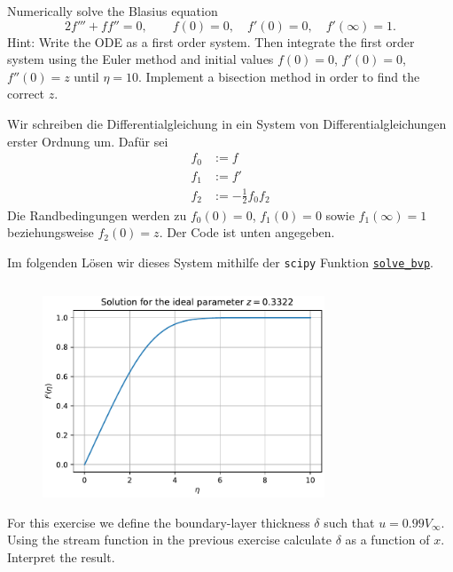\documentclass[12pt]{exam}
\begin{document}
\begin{questions}
    
    \question Numerically solve the Blasius equation
    \begin{equation*}
        2 f''' + ff'' = 0, \qquad f(0) = 0, \quad f'(0) = 0, \quad f'(\infty) = 1.
    \end{equation*}
    Hint: Write the ODE as a first order system. Then integrate the first order system using the Euler method and initial values $f(0) = 0$, $f'(0) = 0$, $f''(0) = z$ until $\eta = 10$. Implement a bisection method in order to find the correct $z$.

    \begin{solution}
        Wir schreiben die Differentialgleichung in ein System von Differentialgleichungen erster Ordnung um. Dafür sei
        \begin{align*}
            f_0 &:= f \\
            f_1 &:= f' \\
            f_2 &:= -\frac{1}{2} f_0 f_2
        \end{align*}
        Die Randbedingungen werden zu $f_0(0) = 0$, $f_1(0) = 0$ sowie $f_1(\infty) = 1$ beziehungsweise $f_2(0) = z$. Der Code ist unten angegeben.
    \end{solution}
    Im folgenden Lösen wir dieses System mithilfe der \texttt{scipy} Funktion \href{https://docs.scipy.org/doc/scipy/reference/generated/scipy.integrate.solve_bvp.html}{\texttt{solve\_bvp}}.
    \inputminted[breaklines, fontsize=\small, frame=single, linenos=true]{python}{blasius_equation.py}
    \begin{figure}[!htbp]
        \centering
        \includegraphics[width=0.75\textwidth]{plot_blasius_equation.pdf}
        \label{fig:blasius_solution}
    \end{figure}
    
    
    \question For this exercise we define the boundary-layer thickness $\delta$ such that $u = 0.99 V_{\infty}$. Using the stream function in the previous exercise calculate $\delta$ as a function of $x$. Interpret the result.
    

\end{questions}
\end{document}

